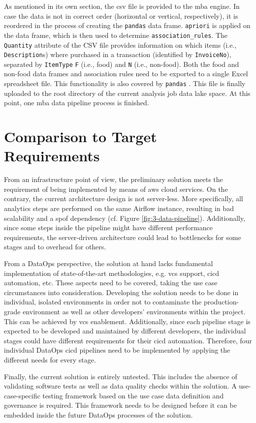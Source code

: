 As mentioned in its own section, the \ac{csv} file is provided to the \ac{mba} engine. In case the data is not in correct order (horizontal or vertical, respectively), it is reordered in the process of creating the \texttt{pandas} data frame. \texttt{apriori} is applied on the data frame, which is then used to determine \texttt{association\_rules}. The \texttt{Quantity} attribute of the CSV file provides information on which items (i.e., \texttt{Description}s) where purchased in a transaction (identified by \texttt{InvoiceNo}), separated by \texttt{ItemType} \texttt{F} (i.e., food) and \texttt{N} (i.e., non-food). Both the food and non-food data frames and association rules need to be exported to a single Excel spreadsheet file. This functionality is also covered by \texttt{pandas} \cite{pandas}. This file is finally uploaded to the root directory of the current analysis job data lake space. At this point, one \ac{mba} data pipeline process is finished. 


\section{Comparison to Target Requirements}
From an infrastructure point of view, the preliminary solution meets the requirement of being implemented by means of \ac{aws} cloud services. On the contrary, the current architecture design is not server-less. More specifically, all analytics steps are performed on the same Airflow instance, resulting in bad scalability and a \ac{spof} dependency (cf. Figure \ref{fig:3-data-pipeline}). Additionally, since some steps inside the pipeline might have different performance requirements, the server-driven architecture could lead to bottlenecks for some stages and to overhead for others.

From a DataOps perspective, the solution at hand lacks fundamental implementation of state-of-the-art methodologies, e.g. \ac{vcs} support, \ac{cicd} automation, etc. These aspects need to be covered, taking the use case circumstances into consideration. Developing the solution needs to be done in individual, isolated environments in order not to contaminate the production-grade environment as well as other developers' environments within the project. This can be achieved by \ac{vcs} enablement. Additionally, since each pipeline stage is expected to be developed and maintained by different developers, the individual stages could have different requirements for their \ac{cicd} automation. Therefore, four individual DataOps \ac{cicd} pipelines need to be implemented by applying the different needs for every stage.

Finally, the current solution is entirely untested. This includes the absence of validating software tests as well as data quality checks within the solution. A use-case-specific testing framework based on the use case data definition and governance is required. This framework needs to be designed before it can be embedded inside the future DataOps processes of the solution.